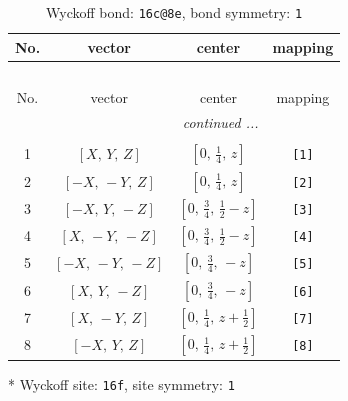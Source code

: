 \documentclass[fleqn,8pt]{jsarticle}
\begin{document}
\renewcommand{\arraystretch}{1.2}
\begin{longtable}{cccc}
\caption{Wyckoff bond: {\tt 16c@8e}, bond symmetry: {\tt 1}}
 \\
 \hline \hline
No. & vector & center & mapping \\ \hline \endfirsthead

\multicolumn{3}{l}{\tablename\ \thetable{}} \\
 \hline \hline
No. & vector & center & mapping \\ \hline \endhead

 \hline \hline
\multicolumn{3}{r}{\footnotesize\it continued ...} \\ \endfoot

 \hline \hline
\multicolumn{3}{r}{} \\ \endlastfoot

1 & $\left[ X,\, Y,\, Z \right]$ & $\left[ 0,\, \frac{1}{4},\, z \right]$ & {\tt [1]} \\ \hline
2 & $\left[ - X,\, - Y,\, Z \right]$ & $\left[ 0,\, \frac{1}{4},\, z \right]$ & {\tt [2]} \\ \hline
3 & $\left[ - X,\, Y,\, - Z \right]$ & $\left[ 0,\, \frac{3}{4},\, \frac{1}{2} - z \right]$ & {\tt [3]} \\ \hline
4 & $\left[ X,\, - Y,\, - Z \right]$ & $\left[ 0,\, \frac{3}{4},\, \frac{1}{2} - z \right]$ & {\tt [4]} \\ \hline
5 & $\left[ - X,\, - Y,\, - Z \right]$ & $\left[ 0,\, \frac{3}{4},\, - z \right]$ & {\tt [5]} \\ \hline
6 & $\left[ X,\, Y,\, - Z \right]$ & $\left[ 0,\, \frac{3}{4},\, - z \right]$ & {\tt [6]} \\ \hline
7 & $\left[ X,\, - Y,\, Z \right]$ & $\left[ 0,\, \frac{1}{4},\, z + \frac{1}{2} \right]$ & {\tt [7]} \\ \hline
8 & $\left[ - X,\, Y,\, Z \right]$ & $\left[ 0,\, \frac{1}{4},\, z + \frac{1}{2} \right]$ & {\tt [8]} \\
\end{longtable}
* Wyckoff site: {\tt 16f}, site symmetry: {\tt 1}
\renewcommand{\arraystretch}{1.2}
\end{document}
